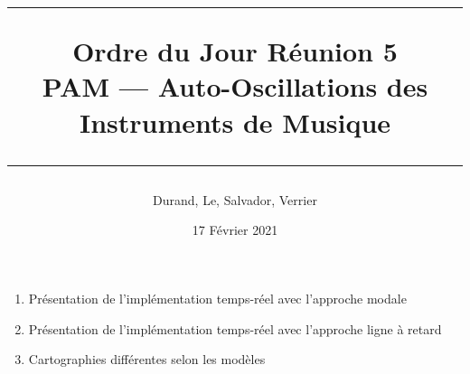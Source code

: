 \documentclass[a4paper, 11pt]{article}
\title{
	\noindent\rule{\linewidth}{0.4pt}
	\huge{Ordre du Jour Réunion 5\\}
	\medskip
	\Large{PAM --- Auto-Oscillations des Instruments de Musique}
	\noindent\rule{\linewidth}{1pt}
}
\author{Durand, Le, Salvador, Verrier}
\date{17 Février 2021}
\begin{document}
\maketitle

\begin{enumerate}
	\item Présentation de l'implémentation temps-réel avec l'approche modale
	\item Présentation de l'implémentation temps-réel avec l'approche ligne à retard
	\item Cartographies différentes selon les modèles
\end{enumerate}
\end{document}
